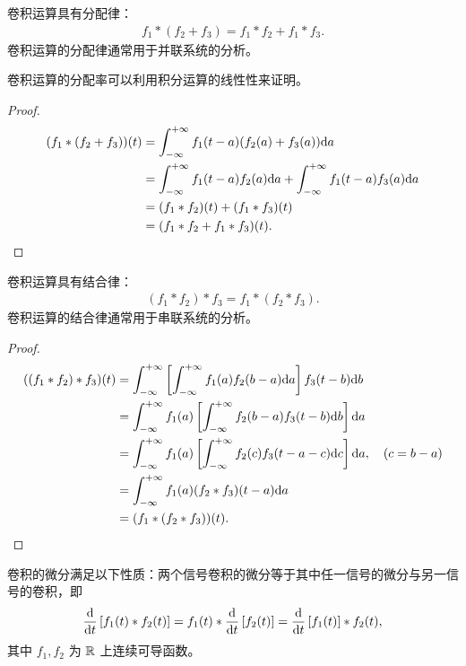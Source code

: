 \begin{property}[卷积运算的分配律]
    卷积运算具有分配律：
    \begin{align*}
        f_1 * (f_2 + f_3) = f_1 * f_2 + f_1 * f_3.
    \end{align*}
    卷积运算的分配律通常用于并联系统的分析。
\end{property}

卷积运算的分配率可以利用积分运算的线性性来证明。

\begin{proof}
    \begin{align*}
        (f_1 * (f_2 + f_3))(t) & = \int_{-\infty}^{+\infty}f_1(t - a)(f_2(a) + f_3(a))\mathrm{d}a \\
        & = \int_{-\infty}^{+\infty}f_1(t - a)f_2(a)\mathrm{d}a + \int_{-\infty}^{+\infty}f_1(t - a)f_3(a)\mathrm{d}a \\
        & = (f_1 * f_2)(t) + (f_1 * f_3)(t) \\
        & = (f_1 * f_2 + f_1 * f_3)(t).
    \end{align*}
\end{proof}

\begin{property}[卷积运算的结合律]
    卷积运算具有结合律：
    \begin{align*}
        (f_1 * f_2) * f_3 = f_1 * (f_2 * f_3).
    \end{align*}
    卷积运算的结合律通常用于串联系统的分析。
\end{property}

\begin{proof}
    \begin{align*}
        ((f_1 * f_2) * f_3)(t) & = \int_{-\infty}^{+\infty}\left[\int_{-\infty}^{+\infty}f_1(a) f_2(b - a)\mathrm{d}a\right]f_3(t - b)\mathrm{d}b \\
        & = \int_{-\infty}^{+\infty}f_1(a)\left[\int_{-\infty}^{+\infty}f_2(b - a)f_3(t - b)\mathrm{d}b\right]\mathrm{d}a \\
        & = \int_{-\infty}^{+\infty}f_1(a)\left[\int_{-\infty}^{+\infty}f_2(c)f_3(t - a - c)\mathrm{d}c\right]\mathrm{d}a, \quad (c = b - a) \\
        & = \int_{-\infty}^{+\infty}f_1(a)(f_2 * f_3)(t - a)\mathrm{d}a \\
        & = (f_1 * (f_2 * f_3))(t).
    \end{align*}
\end{proof}

\begin{property}[卷积的微分性质]
    卷积的微分满足以下性质：两个信号卷积的微分等于其中任一信号的微分与另一信号的卷积，即
    \begin{align*}
        \frac{\D}{\D{t}}\left[f_1(t) * f_2(t)\right]
        = f_1(t) * \frac{\D}{\D{t}}\left[f_2(t)\right]
        = \frac{\D}{\D{t}}\left[f_1(t)\right] * f_2(t),
    \end{align*}
    其中 $f_1, f_2$ 为  $\mathbb{R}$ 上连续可导函数。
\end{property}

